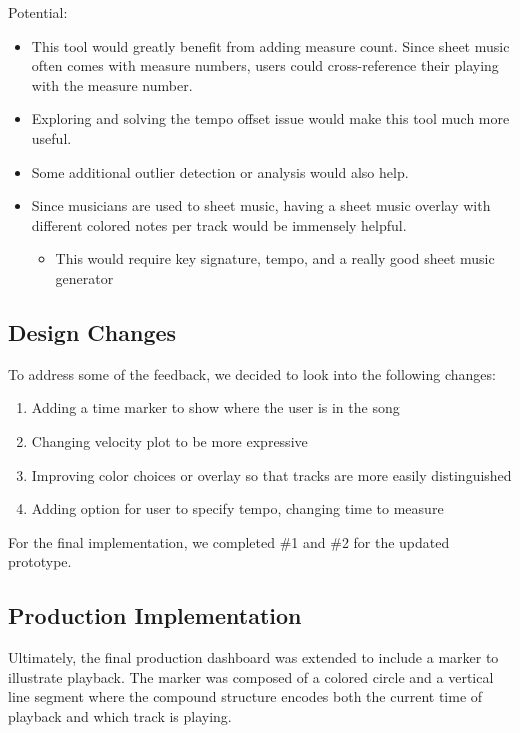 \documentclass[journal]{vgtc}                %
\begin{document}
Potential:
\begin{itemize}
  \item This tool would greatly benefit from adding measure count. Since sheet
  music often comes with measure numbers, users could cross-reference their
  playing with the measure number.
  \item Exploring and solving the tempo offset issue would make this tool much
  more useful.
  \item Some additional outlier detection or analysis would also help.
  \item Since musicians are used to sheet music, having a sheet music overlay
  with different colored notes per track would be immensely helpful.
  \begin{itemize}
    \item This would require key signature, tempo, and a really good sheet music generator
  \end{itemize}
\end{itemize}

\subsection{Design Changes}

To address some of the feedback, we decided to look into the
following changes:

\begin{enumerate}
  \item Adding a time marker to show where the user is in the song
  \item Changing velocity plot to be more expressive
  \item Improving color choices or overlay so that tracks are more easily distinguished
  \item Adding option for user to specify tempo, changing time to measure
\end{enumerate}

For the final implementation, we completed \#1 and \#2 for the updated prototype.

\subsection{Production Implementation}

Ultimately, the final production dashboard was extended to include a marker
to illustrate playback. The marker was composed of a colored circle and a vertical
line segment where the compound structure encodes both the current time of
playback and which track is playing.
\end{document}
